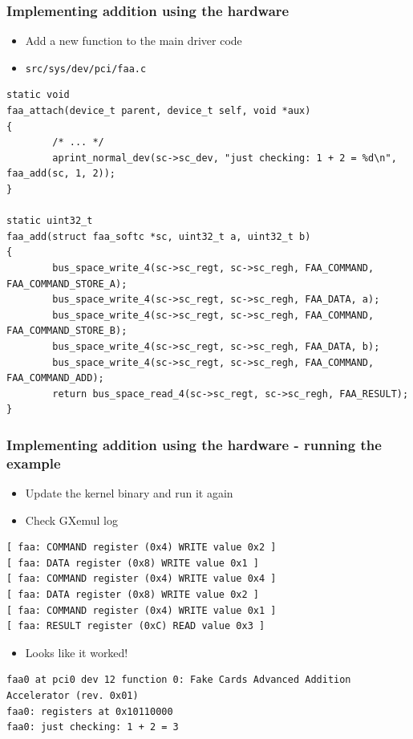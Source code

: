 \documentclass[dvipsnames,table]{beamer}
\begin{document}
\begin{frame}[fragile]
\frametitle{Implementing addition using the hardware}
\begin{itemize}
	\item Add a new function to the main driver code
	\item {\tt src/sys/dev/pci/faa.c}
\end{itemize}
\begin{lstlisting}
static void
faa_attach(device_t parent, device_t self, void *aux)
{
        /* ... */
        aprint_normal_dev(sc->sc_dev, "just checking: 1 + 2 = %d\n", faa_add(sc, 1, 2));
}

static uint32_t
faa_add(struct faa_softc *sc, uint32_t a, uint32_t b)
{
        bus_space_write_4(sc->sc_regt, sc->sc_regh, FAA_COMMAND, FAA_COMMAND_STORE_A);
        bus_space_write_4(sc->sc_regt, sc->sc_regh, FAA_DATA, a);
        bus_space_write_4(sc->sc_regt, sc->sc_regh, FAA_COMMAND, FAA_COMMAND_STORE_B);
        bus_space_write_4(sc->sc_regt, sc->sc_regh, FAA_DATA, b);
        bus_space_write_4(sc->sc_regt, sc->sc_regh, FAA_COMMAND, FAA_COMMAND_ADD);
        return bus_space_read_4(sc->sc_regt, sc->sc_regh, FAA_RESULT);
}
\end{lstlisting}
\end{frame}

\begin{frame}[fragile]
\frametitle{Implementing addition using the hardware - running the example}
\begin{itemize}
	\item Update the kernel binary and run it again
	\item Check GXemul log
\end{itemize}
\begin{verbatim}
[ faa: COMMAND register (0x4) WRITE value 0x2 ]
[ faa: DATA register (0x8) WRITE value 0x1 ]
[ faa: COMMAND register (0x4) WRITE value 0x4 ]
[ faa: DATA register (0x8) WRITE value 0x2 ]
[ faa: COMMAND register (0x4) WRITE value 0x1 ]
[ faa: RESULT register (0xC) READ value 0x3 ]
\end{verbatim}
\begin{itemize}
	\item Looks like it worked!
\end{itemize}
\tiny
\begin{verbatim}
faa0 at pci0 dev 12 function 0: Fake Cards Advanced Addition Accelerator (rev. 0x01)
faa0: registers at 0x10110000
faa0: just checking: 1 + 2 = 3
\end{verbatim}
\end{frame}
\end{document}
